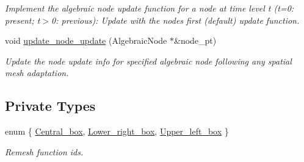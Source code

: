 \begin{DoxyCompactItemize}
\begin{DoxyCompactList}\small\item\em Implement the algebraic node update function for a node at time level t (t=0\+: present; t$>$0\+: previous)\+: Update with the node\textquotesingle{}s first (default) update function. \end{DoxyCompactList}\item 
void \hyperlink{classoomph_1_1AlgebraicRefineableQuarterCircleSectorMesh_a08abc1bf64e0637fc87c36638c41b846}{update\+\_\+node\+\_\+update} (Algebraic\+Node $\ast$\&node\+\_\+pt)
\begin{DoxyCompactList}\small\item\em Update the node update info for specified algebraic node following any spatial mesh adaptation. \end{DoxyCompactList}\end{DoxyCompactItemize}
\subsection*{Private Types}
\begin{DoxyCompactItemize}
\item 
enum \{ \hyperlink{classoomph_1_1AlgebraicRefineableQuarterCircleSectorMesh_a85eef4c11c2a88ba4bb5f99bc8406e67a070fa32a21fc9ed7e0ea2e4ee49bb226}{Central\+\_\+box}, 
\hyperlink{classoomph_1_1AlgebraicRefineableQuarterCircleSectorMesh_a85eef4c11c2a88ba4bb5f99bc8406e67a04eaf51389d87a087fa1e9b2b2bd0315}{Lower\+\_\+right\+\_\+box}, 
\hyperlink{classoomph_1_1AlgebraicRefineableQuarterCircleSectorMesh_a85eef4c11c2a88ba4bb5f99bc8406e67a5ff22a2cd960ec680a42f181d6cbdfb0}{Upper\+\_\+left\+\_\+box}
 \}\begin{DoxyCompactList}\small\item\em Remesh function ids. \end{DoxyCompactList}
\end{DoxyCompactItemize}
